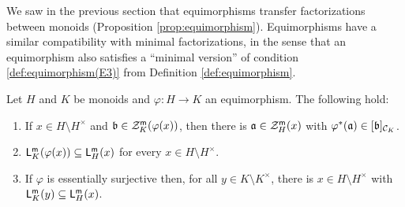 %
We saw in the previous section that equimorphisms transfer factorizations between monoids (Proposition \ref{prop:equimorphism}).  
Equimorphisms have a similar compatibility with minimal factorizations, in the sense that an equimorphism also satisfies a ``minimal version'' of condition \ref{def:equimorphism(E3)} from Definition \ref{def:equimorphism}.
%
%
%
\begin{prop}\label{prop:min-equi}
	Let $H$ and $K$ be monoids and $\varphi: H\to K$ an equimorphism. The following hold: 
	\begin{enumerate}[label={\rm (\roman{*})}]
		\item\label{it:prop:min-equi(i)} If $x\in H \setminus H^\times$ and $\mathfrak{b}\in \mathcal{Z}_K^{\mathsf{m}}(\varphi(x))$, then there is $\mathfrak{a}\in \mathcal{Z}_H^{\mathsf{m}}(x)$ with $\varphi^*(\mathfrak{a})\in [ \mathfrak{b} ]_{\mathcal{C}_K}$.
		\item\label{it:prop:min-equi(ii)} $\mathsf{L}_K^{\mathsf{m}}(\varphi(x)) \subseteq \mathsf{L}_H^{\mathsf{m}}(x)$ for every $x\in H\setminus H^\times$.
		\item\label{it:prop:min-equi(iii)} If $\varphi$ is essentially surjective then, for all $y\in K\setminus K^\times$, there is $x\in H\setminus H^\times$ with $\mathsf{L}_K^{\mathsf{m}}(y) \subseteq \mathsf{L}_H^{\mathsf{m}}(x)$. 
	\end{enumerate}
\end{prop}
%
